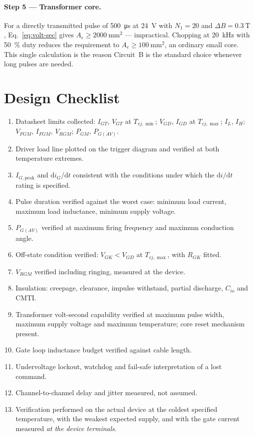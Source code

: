 \documentclass[11pt,a4paper]{article}
\begin{document}
\paragraph{Step 5 --- Transformer core.}
For a directly transmitted pulse of \SI{500}{\micro\second} at \SI{24}{\volt} with
$N_1 = 20$ and $\Delta B = \SI{0.3}{\tesla}$, Eq.~\eqref{eq:volt-sec} gives
$A_e \ge \SI{2000}{\milli\metre\squared}$ --- impractical. Chopping at
\SI{20}{\kilo\hertz} with \SI{50}{\percent} duty reduces the requirement to
$A_e \ge \SI{100}{\milli\metre\squared}$, an ordinary small core. This single
calculation is the reason Circuit~B is the standard choice whenever long pulses
are needed.

\section{Design Checklist}

\begin{enumerate}
  \item Datasheet limits collected: $I_{GT}$, $V_{GT}$ at $T_{vj,\min}$;
        $V_{GD}$, $I_{GD}$ at $T_{vj,\max}$; $I_L$, $I_H$; $V_{FGM}$, $I_{FGM}$,
        $V_{RGM}$; $P_{GM}$, $P_{G(AV)}$.
  \item Driver load line plotted on the trigger diagram and verified at both
        temperature extremes.
  \item $I_{G,\text{peak}}$ and $\mathrm{d}i_G/\mathrm{d}t$ consistent with the
        conditions under which the $\mathrm{d}i/\mathrm{d}t$ rating is specified.
  \item Pulse duration verified against the worst case: minimum load current,
        maximum load inductance, minimum supply voltage.
  \item $P_{G(AV)}$ verified at maximum firing frequency and maximum conduction
        angle.
  \item Off-state condition verified: $V_{GK} < V_{GD}$ at $T_{vj,\max}$, with
        $R_{GK}$ fitted.
  \item $V_{RGM}$ verified including ringing, measured at the device.
  \item Insulation: creepage, clearance, impulse withstand, partial discharge,
        $C_{io}$ and CMTI.
  \item Transformer volt-second capability verified at maximum pulse width,
        maximum supply voltage and maximum temperature; core reset mechanism
        present.
  \item Gate loop inductance budget verified against cable length.
  \item Undervoltage lockout, watchdog and fail-safe interpretation of a lost
        command.
  \item Channel-to-channel delay and jitter measured, not assumed.
  \item Verification performed on the actual device at the coldest specified
        temperature, with the weakest expected supply, and with the gate current
        measured \emph{at the device terminals}.
\end{enumerate}
\end{document}
